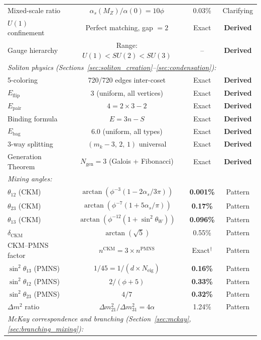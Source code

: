 \documentclass[12pt,a4paper]{article}
\begin{document}
\begin{table}[H]
\begin{tabular}{lccc}
Mixed-scale ratio & $\alpha_s(M_Z)/\alpha(0) = 10\phi$ & 0.03\% & Clarifying \\
$U(1)$ confinement & Perfect matching, gap $= 2$ & Exact & \textbf{Derived} \\
Gauge hierarchy & Range: $U(1) < SU(2) < SU(3)$ & -- & \textbf{Derived} \\
\midrule
\multicolumn{4}{l}{\textit{Soliton physics (Sections~\ref{sec:soliton_creation}--\ref{sec:condensation}):}} \\
5-coloring & 720/720 edges inter-coset & Exact & \textbf{Derived} \\
$E_{\text{flip}}$ & $3$ (uniform, all vertices) & Exact & \textbf{Derived} \\
$E_{\text{pair}}$ & $4 = 2 \times 3 - 2$ & Exact & \textbf{Derived} \\
Binding formula & $E = 3n - S$ & Exact & \textbf{Derived} \\
$E_{\text{bag}}$ & $6.0$ (uniform, all types) & Exact & \textbf{Derived} \\
3-way splitting & $(m_k-3,\, 2,\, 1)$ universal & Exact & \textbf{Derived} \\
Generation Theorem & $N_{\text{gen}} = 3$ (Galois + Fibonacci) & Exact & \textbf{Derived} \\
\midrule
\multicolumn{4}{l}{\textit{Mixing angles:}} \\
$\theta_{12}$ (CKM) & $\arctan(\phi^{-3}(1 - 2\alpha_s/3\pi))$ & \textbf{0.001\%} & Pattern \\
$\theta_{23}$ (CKM) & $\arctan(\phi^{-7}(1 + 5\alpha_s/\pi))$ & \textbf{0.17\%} & Pattern \\
$\theta_{13}$ (CKM) & $\arctan(\phi^{-12}(1 + \sin^2\theta_W))$ & \textbf{0.096\%} & Pattern \\
$\delta_{\text{CKM}}$ & $\arctan(\sqrt{5})$ & 0.55\% & Pattern \\
CKM--PMNS factor & $n^{\text{CKM}} = 3 \times n^{\text{PMNS}}$ & Exact$^\dagger$ & Pattern \\
$\sin^2\theta_{13}$ (PMNS) & $1/45 = 1/(d \times N_{\text{eig}})$ & \textbf{0.16\%} & Pattern \\
$\sin^2\theta_{12}$ (PMNS) & $2/(\phi+5)$ & \textbf{0.33\%} & Pattern \\
$\sin^2\theta_{23}$ (PMNS) & $4/7$ & \textbf{0.32\%} & Pattern \\
$\Delta m^2$ ratio & $\Delta m^2_{21}/\Delta m^2_{31} = 4\alpha$ & 1.24\% & Pattern \\
\midrule
\multicolumn{4}{l}{\textit{McKay correspondence and branching (Section~\ref{sec:mckay}, \ref{sec:branching_mixing}):}} \\

\end{tabular}
\end{table}
\end{document}
